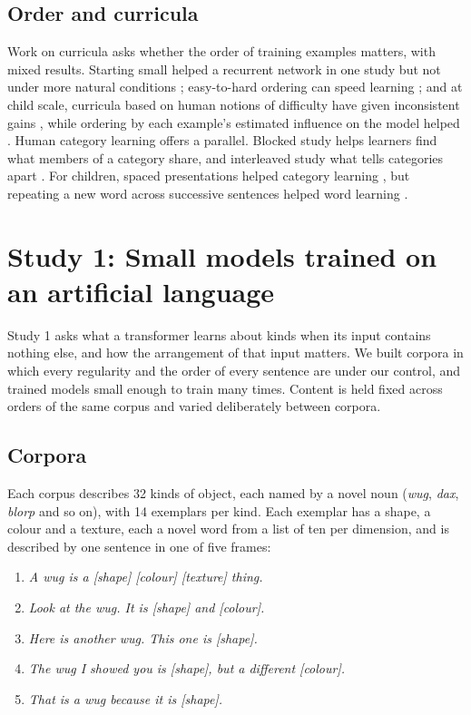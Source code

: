 \subsection{Order and curricula}
Work on curricula asks whether the order of training examples matters, with mixed results. Starting small helped a recurrent network in one study \cite{elman1993} but not under more natural conditions \cite{rohde1999}; easy-to-hard ordering can speed learning \cite{bengio2009}; and at child scale, curricula based on human notions of difficulty have given inconsistent gains \cite{diehlmartinez2023}, while ordering by each example's estimated influence on the model helped \cite{schoenegger2025}. Human category learning offers a parallel. Blocked study helps learners find what members of a category share, and interleaved study what tells categories apart \cite{carvalho2014}. For children, spaced presentations helped category learning \cite{vlach2008}, but repeating a new word across successive sentences helped word learning \cite{schwab2016}.

\section{Study 1: Small models trained on an artificial language}
Study 1 asks what a transformer learns about kinds when its input contains nothing else, and how the arrangement of that input matters. We built corpora in which every regularity and the order of every sentence are under our control, and trained models small enough to train many times. Content is held fixed across orders of the same corpus and varied deliberately between corpora.

\subsection{Corpora}
Each corpus describes 32 kinds of object, each named by a novel noun (\emph{wug}, \emph{dax}, \emph{blorp} and so on), with 14 exemplars per kind. Each exemplar has a shape, a colour and a texture, each a novel word from a list of ten per dimension, and is described by one sentence in one of five frames:

\begin{enumerate}
\item \emph{A wug is a [shape] [colour] [texture] thing.}
\item \emph{Look at the wug. It is [shape] and [colour].}
\item \emph{Here is another wug. This one is [shape].}
\item \emph{The wug I showed you is [shape], but a different [colour].}
\item \emph{That is a wug because it is [shape].}
\end{enumerate}

